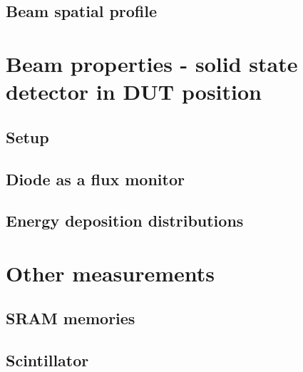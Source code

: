 \documentclass{cernatsnote}
\begin{document}
\subsection{Beam spatial profile} %


\section{Beam properties - solid state detector in DUT position}

\subsection{Setup} %


\subsection{Diode as a flux monitor} %


\subsection{Energy deposition distributions} %


\section{Other measurements}
\subsection{SRAM memories} %


\subsection{Scintillator} %


\newpage


\end{document}
